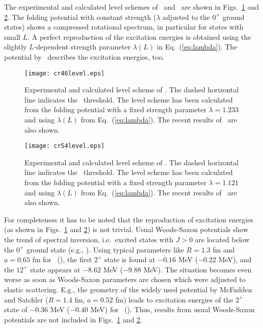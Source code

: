 The experimental and calculated level schemes of \crvi\ and \criv\ are shown
in Figs.~\ref{fig:cr46level} and \ref{fig:cr54level}. The folding potential
with constant strength ($\lambda$ adjusted to the $0^+$ ground states)
shows a compressed rotational spectrum, in particular for states with small
$L$. A perfect reproduction of the excitation energies is obtained using the
slightly $L$-dependent strength parameter $\lambda(L)$ in
Eq.~(\ref{eq:lambda}). The potential by \SM\ describes the excitation
energies, too.
%
\begin{figure}[htb]
  \texttt{[image: cr46level.eps]}
\caption{
Experimental and calculated level scheme of \crvi . The dashed horizontal line
indicates the \al\ threshold. The level scheme has been calculated from the
folding potential with a fixed strength parameter $\lambda = 1.233$ and using
$\lambda(L)$ from Eq.~(\ref{eq:lambda}). The recent results of \SM\ are also
shown.
}
\label{fig:cr46level}
\end{figure}
%
\begin{figure}[htb]
  \texttt{[image: cr54level.eps]}
\caption{
Experimental and calculated level scheme of \criv . The dashed horizontal line
indicates the \al\ threshold. The level scheme has been calculated from the
folding potential with a fixed strength parameter $\lambda = 1.121$ and using
$\lambda(L)$ from Eq.~(\ref{eq:lambda}). The recent results of \SM\ are also
shown.
}
\label{fig:cr54level}
\end{figure}
%

For completeness it has to be noted that the reproduction of excitation
energies (as shown in Figs.~\ref{fig:cr46level} and \ref{fig:cr54level}) is
not trivial. Usual Woods-Saxon potentials show the trend of spectral
inversion, i.e.\ excited states with $J > 0$ are located below the $0^+$
ground state (e.g., \cite{Mohr08}). Using typical parameters like $R = 1.3$ fm
and $a = 0.65$ fm for \crvi\ (\criv ), the first $2^+$ state is found at
$-0.16$ MeV ($-0.22$ MeV), and the $12^+$ state appears at $-8.62$ MeV
($-9.88$ MeV). The situation becomes even worse as soon as Woods-Saxon
parameters are chosen which were adjusted to elastic scattering. E.g., the
geometry of the widely used potential by McFadden and Satchler \cite{McF66}
($R = 1.4$ fm, $a = 0.52$ fm) leads to excitation energies of the $2^+$ state
of $-0.36$ MeV ($-0.40$ MeV) for \crvi\ (\criv ). Thus, results from usual
Woods-Saxon potentials are not included in Figs.~\ref{fig:cr46level} and
\ref{fig:cr54level}.

